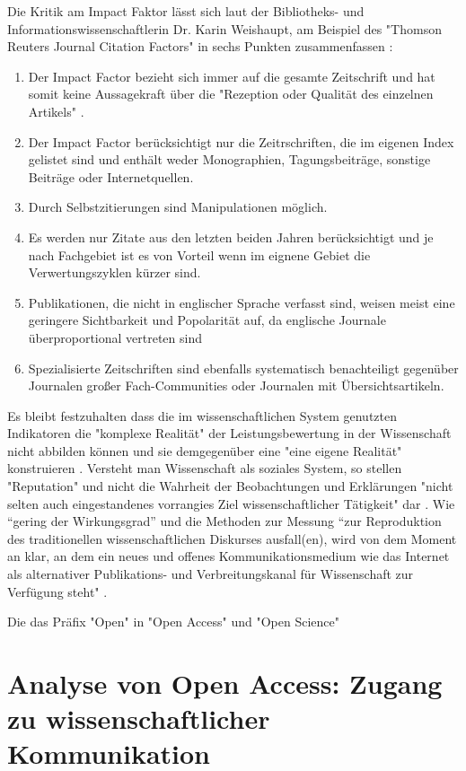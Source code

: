 Die Kritik am Impact Faktor lässt sich laut der Bibliotheks- und Informationswissenschaftlerin Dr. Karin Weishaupt, am Beispiel des "Thomson Reuters Journal Citation Factors" in sechs Punkten zusammenfassen \cite{weishaupt_2009_goldenOA}:
\begin{enumerate}
\item Der Impact Factor bezieht sich immer auf die gesamte Zeitschrift und hat somit keine Aussagekraft über die "Rezeption oder Qualität des einzelnen Artikels" .
\item Der Impact Factor berücksichtigt nur die Zeitrschriften, die im eigenen Index gelistet sind und enthält weder Monographien, Tagungsbeiträge, sonstige Beiträge oder Internetquellen.
\item Durch Selbstzitierungen sind Manipulationen möglich.
\item Es werden nur Zitate aus den letzten beiden Jahren berücksichtigt und je nach Fachgebiet ist es von Vorteil wenn im eignene Gebiet die Verwertungszyklen kürzer sind.
\item Publikationen, die nicht in englischer Sprache verfasst sind, weisen meist eine geringere Sichtbarkeit und Popolarität auf, da englische Journale überproportional vertreten sind
\item Spezialisierte Zeitschriften sind ebenfalls systematisch benachteiligt gegenüber Journalen großer Fach-Communities oder Journalen mit Übersichtsartikeln.
\end{enumerate}

Es bleibt festzuhalten dass die im wissenschaftlichen System genutzten Indikatoren die "komplexe Realität" der Leistungsbewertung in der Wissenschaft nicht abbilden können und sie demgegenüber eine "eine eigene Realität" konstruieren \cite{Hornbostel_1997}. Versteht man Wissenschaft als soziales System, so stellen "Reputation" und nicht die Wahrheit der Beobachtungen und Erklärungen "nicht selten auch eingestandenes vorrangies Ziel wissenschaftlicher Tätigkeit" dar \cite{luhmann_1970_selbststeuerung}. Wie “gering der Wirkungsgrad” und die Methoden zur Messung “zur Reproduktion des traditionellen wissenschaftlichen Diskurses ausfall(en), wird von dem Moment an klar, an dem ein neues und offenes Kommunikationsmedium wie das Internet als alternativer Publikations- und Verbreitungskanal für Wissenschaft zur Verfügung steht" \cite{Rost_1998}. 

Die das Präfix "Open" in "Open Access" und "Open Science" 

\section{Analyse von Open Access: Zugang zu wissenschaftlicher Kommunikation} 

